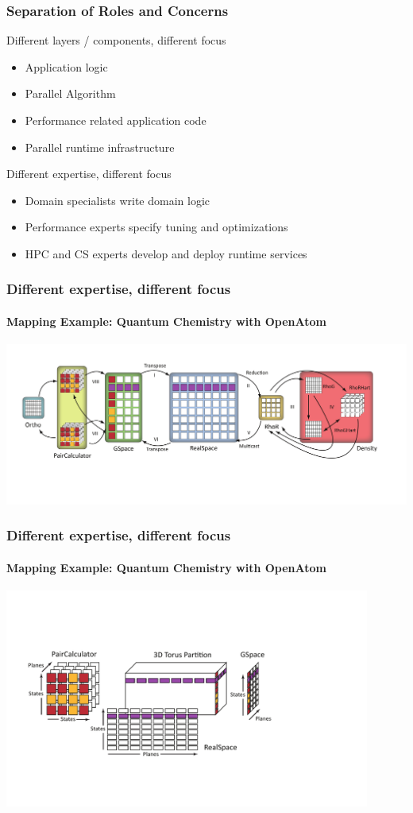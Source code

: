 \begin{frame}
\frametitle{Separation of Roles and Concerns}
\begin{block}{Different layers / components, different focus}
    \begin{itemize}
        \item Application logic
        \item Parallel Algorithm
        \item Performance related application code
        \item Parallel runtime infrastructure
    \end{itemize}
\end{block}
\pause
\begin{block}{Different expertise, different focus}
    \begin{itemize}
        \item Domain specialists write domain logic
        \item Performance experts specify tuning and optimizations
        \item HPC and CS experts develop and deploy runtime services
    \end{itemize}
\end{block}
\end{frame}


\begin{frame}
\frametitle{Different expertise, different focus}
\framesubtitle{Mapping Example: Quantum Chemistry with {\sc OpenAtom}}
\includegraphics[width=\textwidth]{../figures/openatom/control-flow.pdf}
\end{frame}

\begin{frame}
\frametitle{Different expertise, different focus}
\framesubtitle{Mapping Example: Quantum Chemistry with {\sc OpenAtom}}
\includegraphics[width=0.9\textwidth]{../figures/openatom/mapping.pdf}
\end{frame}



